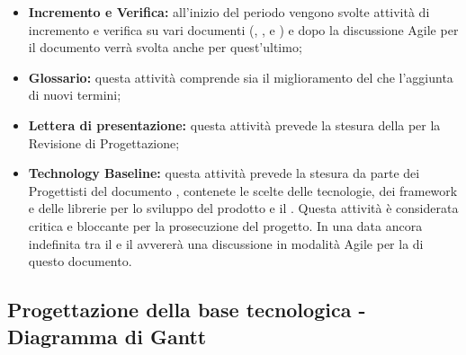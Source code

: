 \documentclass[PianoDiProgetto.tex]{subfiles}
\begin{document}
\begin{itemize}
	\item \textbf{Incremento e Verifica:} all'inizio del periodo vengono svolte attività di incremento e verifica su vari documenti (\ndp, \pdp, \pdq e \adr) e dopo la discussione Agile per il documento \tb verrà svolta anche per quest'ultimo;
	\item \textbf{Glossario:} questa attività comprende sia il miglioramento del \g che l'aggiunta di nuovi termini;
	\item \textbf{Lettera di presentazione:} questa attività prevede la stesura della  per la Revisione di Progettazione;
	\item \textbf{Technology Baseline:} questa attività prevede la stesura da parte dei Progettisti del documento \tb, contenete le scelte delle tecnologie, dei framework e delle librerie per lo sviluppo del prodotto e il . Questa attività è considerata critica e bloccante per la prosecuzione del progetto. In una data ancora indefinita tra il  e il  avvererà una discussione in modalità Agile per la  di questo documento.
\end{itemize}
\begin{landscape}
	\subsection{Progettazione della base tecnologica - Diagramma di Gantt}
\end{landscape}
\end{document}
